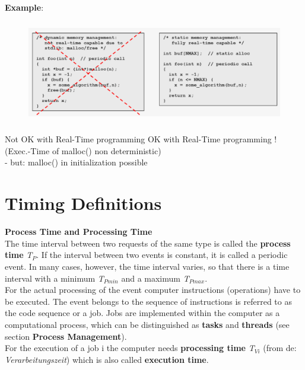 \textbf{Example}:

	\begin{figure}[h]
    \centering
    \includegraphics[width=14cm, height=4.5cm]{Images/image74.png}
    \label{fig:Fig 20}
    \end{figure}
    
Not OK with Real-Time programming   \hspace{2cm} OK with Real-Time programming !\\
(Exec.-Time of malloc() non deterministic)\\
- but: malloc() in initialization possible  

\section{Timing Definitions}

{\rot\bf Process Time and Processing Time}\\

The time interval between two requests of the same type is called the \textbf{process time} \textit{T${}_{P}$}. If the interval between two events is constant, it is called a periodic event. In many cases, however, the time interval varies, so that there is a time interval with a minimum \textit{T${}_{Pmin}$} and a maximum \textit{T${}_{Pmax}$}.\\

For the actual processing of the event computer instructions (operations) have to be executed. The event belongs to the sequence of instructions is referred to as the code sequence or a job. Jobs are implemented within the computer as a computational process, which can be distinguished as \textbf{tasks} and \textbf{threads} (see section \textbf{Process Management}). \\

For the execution of a job i the computer needs \textbf{processing time} \textit{T${}_{Vi}$} (from de: \textit{Verarbeitungszeit}) which is also called \textbf{execution time}.\\

